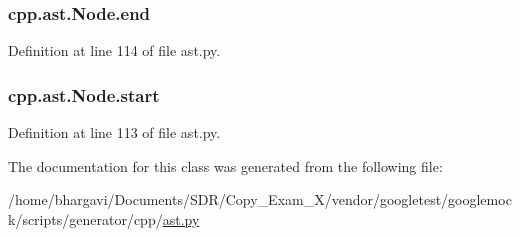 \subsubsection[{\texorpdfstring{end}{end}}]{\setlength{\rightskip}{0pt plus 5cm}cpp.\+ast.\+Node.\+end}\hypertarget{classcpp_1_1ast_1_1_node_a3c5e5246ccf619df28eca02e29d69647}{}\label{classcpp_1_1ast_1_1_node_a3c5e5246ccf619df28eca02e29d69647}


Definition at line 114 of file ast.\+py.

\subsubsection[{\texorpdfstring{start}{start}}]{\setlength{\rightskip}{0pt plus 5cm}cpp.\+ast.\+Node.\+start}\hypertarget{classcpp_1_1ast_1_1_node_a7b2aa97e6a049bb1a93aea48c48f1f44}{}\label{classcpp_1_1ast_1_1_node_a7b2aa97e6a049bb1a93aea48c48f1f44}


Definition at line 113 of file ast.\+py.



The documentation for this class was generated from the following file\+:\begin{DoxyCompactItemize}
\item 
/home/bhargavi/\+Documents/\+S\+D\+R/\+Copy\+\_\+\+Exam\+\_\+X/vendor/googletest/googlemock/scripts/generator/cpp/\hyperlink{ast_8py}{ast.\+py}\end{DoxyCompactItemize}
